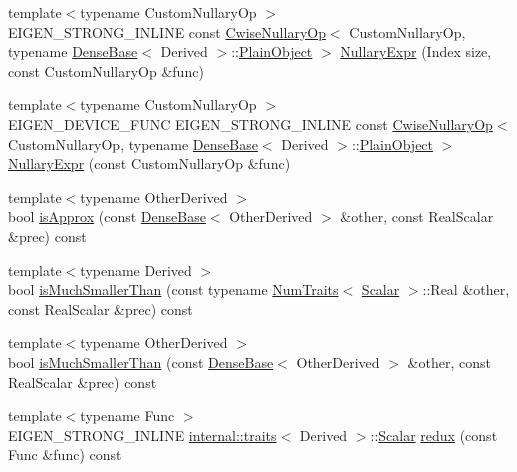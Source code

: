 \begin{DoxyCompactItemize}
\item 
{\footnotesize template$<$typename Custom\+Nullary\+Op $>$ }\\E\+I\+G\+E\+N\+\_\+\+S\+T\+R\+O\+N\+G\+\_\+\+I\+N\+L\+I\+NE const \mbox{\hyperlink{class_eigen_1_1_cwise_nullary_op}{Cwise\+Nullary\+Op}}$<$ Custom\+Nullary\+Op, typename \mbox{\hyperlink{class_eigen_1_1_dense_base}{Dense\+Base}}$<$ Derived $>$\+::\mbox{\hyperlink{class_eigen_1_1_dense_base_aae45af9b5aca5a9caae98fd201f47cc4}{Plain\+Object}} $>$ \mbox{\hyperlink{class_eigen_1_1_dense_base_a3b9b80fd43c6c62a340d7497a144cf28}{Nullary\+Expr}} (Index size, const Custom\+Nullary\+Op \&func)
\item 
{\footnotesize template$<$typename Custom\+Nullary\+Op $>$ }\\E\+I\+G\+E\+N\+\_\+\+D\+E\+V\+I\+C\+E\+\_\+\+F\+U\+NC E\+I\+G\+E\+N\+\_\+\+S\+T\+R\+O\+N\+G\+\_\+\+I\+N\+L\+I\+NE const \mbox{\hyperlink{class_eigen_1_1_cwise_nullary_op}{Cwise\+Nullary\+Op}}$<$ Custom\+Nullary\+Op, typename \mbox{\hyperlink{class_eigen_1_1_dense_base}{Dense\+Base}}$<$ Derived $>$\+::\mbox{\hyperlink{class_eigen_1_1_dense_base_aae45af9b5aca5a9caae98fd201f47cc4}{Plain\+Object}} $>$ \mbox{\hyperlink{class_eigen_1_1_dense_base_a158e2b0e2d8501bf8e85928c0c5eff6d}{Nullary\+Expr}} (const Custom\+Nullary\+Op \&func)
\item 
{\footnotesize template$<$typename Other\+Derived $>$ }\\bool \mbox{\hyperlink{class_eigen_1_1_dense_base_a8848223bc635c9c10e7cc68ae343ad81}{is\+Approx}} (const \mbox{\hyperlink{class_eigen_1_1_dense_base}{Dense\+Base}}$<$ Other\+Derived $>$ \&other, const Real\+Scalar \&prec) const
\item 
{\footnotesize template$<$typename Derived $>$ }\\bool \mbox{\hyperlink{class_eigen_1_1_dense_base_adfca6ff4e473f68fbbeabbd03b7504a9}{is\+Much\+Smaller\+Than}} (const typename \mbox{\hyperlink{struct_eigen_1_1_num_traits}{Num\+Traits}}$<$ \mbox{\hyperlink{class_eigen_1_1_dense_base_a5feed465b3a8e60c47e73ecce83e39a2}{Scalar}} $>$\+::Real \&other, const Real\+Scalar \&prec) const
\item 
{\footnotesize template$<$typename Other\+Derived $>$ }\\bool \mbox{\hyperlink{class_eigen_1_1_dense_base_a7d61b8814a7547e88b25cba68b159f05}{is\+Much\+Smaller\+Than}} (const \mbox{\hyperlink{class_eigen_1_1_dense_base}{Dense\+Base}}$<$ Other\+Derived $>$ \&other, const Real\+Scalar \&prec) const
\item 
{\footnotesize template$<$typename Func $>$ }\\E\+I\+G\+E\+N\+\_\+\+S\+T\+R\+O\+N\+G\+\_\+\+I\+N\+L\+I\+NE \mbox{\hyperlink{struct_eigen_1_1internal_1_1traits}{internal\+::traits}}$<$ Derived $>$\+::\mbox{\hyperlink{class_eigen_1_1_dense_base_a5feed465b3a8e60c47e73ecce83e39a2}{Scalar}} \mbox{\hyperlink{class_eigen_1_1_dense_base_ae2a645f73c87aa77857035a02a0d9778}{redux}} (const Func \&func) const

\end{DoxyCompactItemize}
